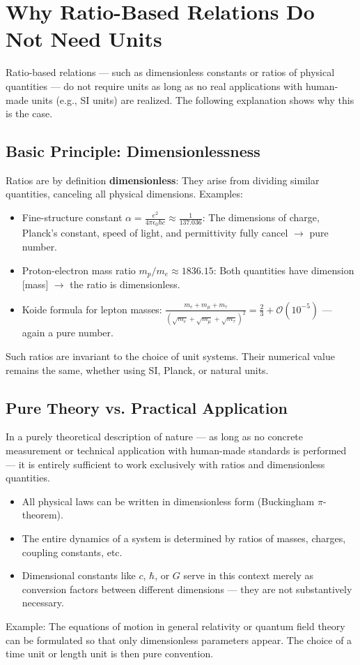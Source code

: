 	\section{Why Ratio-Based Relations Do Not Need Units}
	Ratio-based relations --- such as dimensionless constants or ratios of physical quantities --- do not require units as long as no real applications with human-made units (e.g., SI units) are realized. The following explanation shows why this is the case.
	
	\subsection{Basic Principle: Dimensionlessness}
	Ratios are by definition \textbf{dimensionless}: They arise from dividing similar quantities, canceling all physical dimensions.
	Examples:
	\begin{itemize}
		\item Fine-structure constant $\alpha = \frac{e^2}{4\pi \epsilon_0 \hbar c} \approx \frac{1}{137.036}$:
		The dimensions of charge, Planck's constant, speed of light, and permittivity fully cancel $\to$ pure number.
		\item Proton-electron mass ratio $m_p / m_e \approx 1836.15$:
		Both quantities have dimension [mass] $\to$ the ratio is dimensionless.
		\item Koide formula for lepton masses:
		$\frac{m_e + m_\mu + m_\tau}{(\sqrt{m_e} + \sqrt{m_\mu} + \sqrt{m_\tau})^2} = \frac{2}{3} + \mathcal{O}(10^{-5})$ --- again a pure number.
	\end{itemize}
	Such ratios are invariant to the choice of unit systems. Their numerical value remains the same, whether using SI, Planck, or natural units.
	
	\subsection{Pure Theory vs. Practical Application}
	In a purely theoretical description of nature --- as long as no concrete measurement or technical application with human-made standards is performed --- it is entirely sufficient to work exclusively with ratios and dimensionless quantities.
	\begin{itemize}
		\item All physical laws can be written in dimensionless form (Buckingham $\pi$-theorem).
		\item The entire dynamics of a system is determined by ratios of masses, charges, coupling constants, etc.
		\item Dimensional constants like $c$, $\hbar$, or $G$ serve in this context merely as conversion factors between different dimensions --- they are not substantively necessary.
	\end{itemize}
	Example: The equations of motion in general relativity or quantum field theory can be formulated so that only dimensionless parameters appear. The choice of a time unit or length unit is then pure convention.
	
